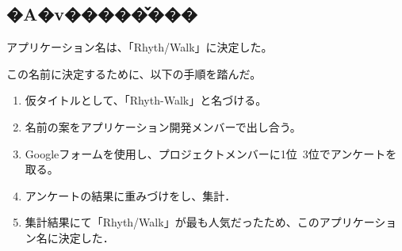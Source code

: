 \subsection{�A�v�����̌���}
アプリケーション名は、「Rhyth/Walk」に決定した。\par
この名前に決定するために、以下の手順を踏んだ。
\begin{enumerate}
\item 仮タイトルとして、「Rhyth-Walk」と名づける。
\item 名前の案をアプリケーション開発メンバーで出し合う。
\item Googleフォームを使用し、プロジェクトメンバーに1位~3位でアンケートを取る。
\item アンケートの結果に重みづけをし、集計．
\item 集計結果にて「Rhyth/Walk」が最も人気だったため、このアプリケーション名に決定した．
\end{enumerate}

